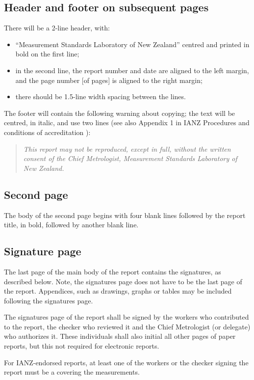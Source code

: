 \subsection{Header and footer on subsequent pages}
There will be a 2-line header, with: 
\begin{itemize}
\item	``Measurement Standards Laboratory of New Zealand'' centred and printed in bold on the first line; 
\item	in the second line, the report number and date are aligned to the left margin, and the page number [of pages] is aligned to the right margin;
\item	there should be 1.5-line width spacing between the lines.
\end{itemize}
The footer will contain the following warning about copying; the text will be centred, in italic, and use two lines (see also Appendix 1 in IANZ Procedures and conditions of accreditation \cite{IANZ_PC}): 
\begin{quote}
\centering\textit{This report may not be reproduced, except in full, without the written consent of the Chief Metrologist, Measurement Standards Laboratory of New Zealand.}
\end{quote}

\subsection{Second page}
The body of the second page begins with four blank lines followed by the report title, in bold, followed by another blank line.

\subsection{Signature page}
The last page of the main body of the report contains the signatures, as described below. Note, the signatures page does not have to be the last page of the report. Appendices, such as drawings, graphs or tables may be included following the signatures page.

The signatures page of the report shall be signed by the workers who contributed to the report, the checker who reviewed it and the Chief Metrologist (or delegate) who authorizes it. These individuals shall also initial all other pages of paper reports, but this not required for electronic reports.

For IANZ-endorsed reports, at least one of the workers or the checker signing the report must be a    covering the measurements.

